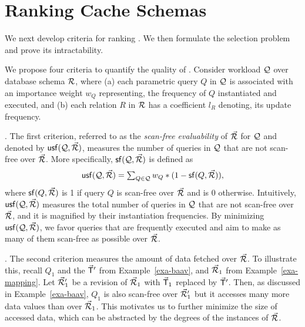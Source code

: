 \vspace{2ex}
\section{Ranking Cache Schemas}
\label{sec-rank}


We next develop criteria for ranking \bdss. We then
formulate the \bds selection problem  and
prove its intractability.








We propose four criteria to quantify
the quality of \bdss. 
Consider workload $\mathcal Q$ over database schema ${\mathcal R}$, where (a) each
parametric query $Q$ in $\mathcal Q$ is associated with an importance
weight $w_{Q}$ representing, \eg the frequency of $Q$ 
instantiated and executed, and (b) each relation $R$ in ${\mathcal R}$
has a coefficient $l_{R}$ denoting, \eg its update frequency.

.
The first criterion, referred to as the {\em scan-free
evaluability} of $\vec{{\mathcal R}}$ for $\mathcal Q$ and denoted by ${\mathsf{usf}}(\mathcal Q,
\vec{{\mathcal R}})$, measures the number of queries in $\mathcal Q$ that are not
scan-free over $\vec{{\mathcal R}}$. More specifically, ${\mathsf{sf}}(\mathcal Q, \vec{{\mathcal R}})$
is defined as
\vspace{-0.7ex}
\[\usf(\Q, \kb{\R}) = \textstyle \sum_{Q\in \Q} w_{Q} * (1 - \sf(Q, \kb{\R})),
\vspace{-0.7ex}\]
where ${\mathsf{sf}}(Q,\allowbreak \vec{{\mathcal R}})$ is 1 if query
$Q$ is scan-free over $\vec{{\mathcal R}}$
and is 0 otherwise. Intuitively, ${\mathsf{usf}}(\mathcal Q,\allowbreak \vec{{\mathcal R}})$ measures
the total number of queries in $\mathcal Q$ that are not scan-free over
$\vec{{\mathcal R}}$,
and it is magnified by their instantiation frequencies.
By minimizing ${\mathsf{usf}}(\mathcal Q,\allowbreak \vec{{\mathcal R}})$, we favor queries that are
frequently executed and aim to make as many of them
  scan-free as possible over $\vec{{\mathcal R}}$.

.
The second criterion measures
the amount of data fetched over $\vec{{\mathcal R}}$.
%
To illustrate this,
recall $Q_{1}$ and the \bs $\vec{\protect\mathsf{T}}'$ from
Example~\ref{exa-baav},
and \bds $\vec{{\mathcal R}}_{1}$ from Example~\ref{exa-mapping}. Let $\vec{{\mathcal R}}'_{1}$
be a revision of $\vec{{\mathcal R}}_{1}$ with $\vec{\protect\mathsf{T}}_{1}$ replaced by
$\vec{\protect\mathsf{T}}'$. Then, as discussed in Example~\ref{exa-baav},
$Q_{1}$ is also scan-free over $\vec{{\mathcal R}}'_{1}$  but it accesses many
more data values than over $\vec{{\mathcal R}}_{1}$. 
This motivates us to further minimize the size of accessed data, 
which can be abstracted by the
degrees of the \baav instances of $\vec{{\mathcal R}}$.

